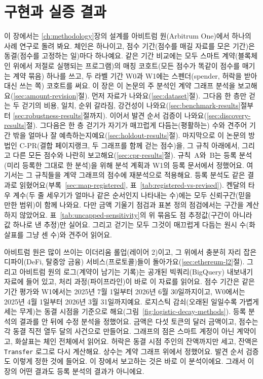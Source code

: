 \chapter{구현과 실증 결과}
\label{ch:results}

이 장에서는 \ref{ch:methodology}장의 설계를 아비트럼 원(Arbitrum One)에서 하나의 사례 연구로 돌려 봐요. 체인은 하나이고, 점수 기간(점수를 매길 자료를 모은 기간)은 동결(점수를 고정하는 일)마다 하나예요. 같은 기간 비교에는 모두 스마트 계약(블록체인 위에서 저절로 실행되는 프로그램)의 매칭 코호트(모든 점수가 똑같이 점수를 매기는 계약 묶음) 하나를 쓰고, 두 라벨 기간 W0과 W1에는 스펜더(spender, 허락을 받아 대신 쓰는 쪽) 코호트를 써요. 이 장은 이 논문의 주 분석인 계약 그래프 분석을 보고해요(\ref{sec:amount-revision}절). 먼저 자료가 나와요(\ref{sec:dataset}절). 그다음 한 층만 걷는 두 걷기의 비용, 일치, 순위 갈라짐, 강건성이 나와요(\ref{sec:benchmark-results}절부터 \ref{sec:robustness-results}절까지). 이어서 발견 순서 검증이 나와요(\ref{sec:discovery-results}절). 그다음은 한 층 걷기가 자기가 매끄럽게 다듬는(평활하는) 수와 견주어 기간 밖을 얼마나 잘 예측하는지예요(\ref{sec:holdout-results}절). 마지막으로 이 논문의 방법인 \mbox{C-PR}(결합 페이지랭크, 두 그래프를 함께 걷는 점수)을, 그 규칙 아래에서, 그리고 다른 모든 점수와 나란히 보고해요(\ref{sec:cpr-results}절). 규칙~A와~B는 등록 분석(미리 등록한 그대로 한 분석)을 위해 분석 계획과 W1의 등록 문서에서 정했어요. 여기서는 그 규칙들을 계약 그래프의 점수에 재분석으로 적용해요. 등록 분석도 같은 결과로 읽혔어요(부록~\ref{sec:map-registered}, 표~\ref{tab:registered-vs-revised}). 켄달의 타우 계수(두 줄 세우기가 얼마나 같은 순서인지 나타내는 수)에는 모두 신뢰구간(믿을 만한 범위)이 함께 나와요. 다만 금액 기울기 점검과 표본 정의 점검에서는 구간을 계산하지 않았어요. 표~\ref{tab:uncapped-sensitivity}의 위 묶음도 점 추정값(구간이 아니라 값 하나로 낸 추정)만 실어요. 그리고 걷기는 모두 그것이 매끄럽게 다듬는 원시 수(화살표를 그냥 센 수)와 견주어 읽어요.


아비트럼 원은 많이 쓰이는 이더리움 롤업(레이어 2)이고, 그 위에서 충분히 자리 잡은 디파이(DeFi, 탈중앙 금융) 서비스(프로토콜)들이 돌아가요(\ref{sec:ethereum-l2}절). 그리고 아비트럼 원의 로그(계약이 남기는 기록)는 공개된 빅쿼리(BigQuery) 내보내기 자료에 들어 있고, 처리 과정(파이프라인)이 바로 이 자료를 읽어요. 점수 기간은 같은 기간 평가와 W1에서는 2025년 7월 1일부터 2026년 6월 30일까지이고, W0에서는 2025년 4월 1일부터 2026년 3월 31일까지예요. 로지스틱 감쇠(오래된 일일수록 가볍게 세는 무게)는 동결 시점을 기준으로 해요(그림~\ref{fig:logistic-decay-methods}). 등록 분석의 결과를 안 뒤에 수정 분석을 정했어요. 금액은 다섯 토큰의 달러 금액이고, 점수는 각 동결 직전 열두 달의 사건으로 만들어요. 그래프의 점은 스마트 계정이 아닌 계약이고, 화살표는 체인 전체에서 읽어요. 허락은 동결 시점 주인의 잔액까지만 세고, 잔액은 \texttt{Transfer} 로그로 다시 계산해요. 상수는 계약 그래프 위에서 정했어요. 발견 순서 검증도 이렇게 정한 것에 들어요. 이 장에서 보고하는 것은 바로 이 분석이에요. 그래서 이 장의 어떤 결과도 등록 분석의 결과가 아니에요.

